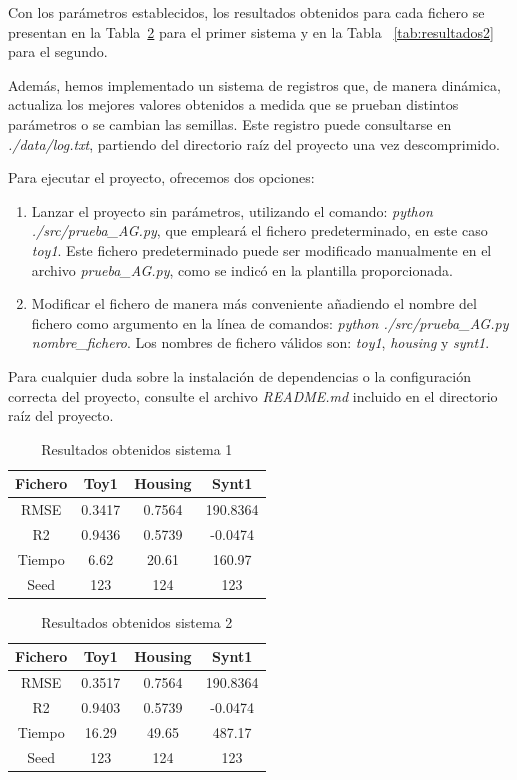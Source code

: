 \documentclass[conference,a4paper]{IEEEtran}
\begin{document}
Con los parámetros establecidos, los resultados obtenidos para cada fichero se presentan en la Tabla~\ref{tab:resultados1} para el primer sistema y en la Tabla ~\ref{tab:resultados2} para el segundo. 

Además, hemos implementado un sistema de registros que, de manera dinámica, actualiza los mejores valores obtenidos a medida que se prueban distintos parámetros o se cambian las semillas. Este registro puede consultarse en \textit{./data/log.txt}, partiendo del directorio raíz del proyecto una vez descomprimido.

Para ejecutar el proyecto, ofrecemos dos opciones: 
\begin{enumerate}
    \item Lanzar el proyecto sin parámetros, utilizando el comando: \textit{python ./src/prueba\_AG.py}, que empleará el fichero predeterminado, en este caso \textit{toy1}. Este fichero predeterminado puede ser modificado manualmente en el archivo \textit{prueba\_AG.py}, como se indicó en la plantilla proporcionada.

    \item Modificar el fichero de manera más conveniente añadiendo el nombre del fichero como argumento en la línea de comandos: \textit{python ./src/prueba\_AG.py nombre\_fichero}. Los nombres de fichero válidos son: \textit{toy1}, \textit{housing} y \textit{synt1}.
\end{enumerate}


Para cualquier duda sobre la instalación de dependencias o la configuración correcta del proyecto, consulte el archivo \textit{README.md} incluido en el directorio raíz del proyecto.


\begin{table} [H]
  \caption{Resultados obtenidos sistema 1}
  \label{tab:resultados1}
  \centering
  \begin{tabular}{cccc}
    \toprule
     Fichero & Toy1 & Housing & Synt1 \\
    \midrule
    RMSE & 0.3417 & 0.7564 & 190.8364 \\
    R2 & 0.9436 & 0.5739 & -0.0474 \\
    \midrule
    Tiempo & 6.62 & 20.61 & 160.97 \\
    Seed & 123 & 124 & 123 \\
    \bottomrule
  \end{tabular}
\end{table}

\begin{table} [H]
  \caption{Resultados obtenidos sistema 2}
  \label{tab:resultados1}
  \centering
  \begin{tabular}{cccc}
    \toprule
     Fichero & Toy1 & Housing & Synt1 \\
    \midrule
    RMSE & 0.3517 & 0.7564 & 190.8364 \\
    R2 & 0.9403 & 0.5739 & -0.0474 \\
    \midrule
    Tiempo & 16.29 & 49.65 & 487.17 \\
    Seed & 123 & 124 & 123 \\
    \bottomrule
  \end{tabular}
\end{table}
\end{document}
